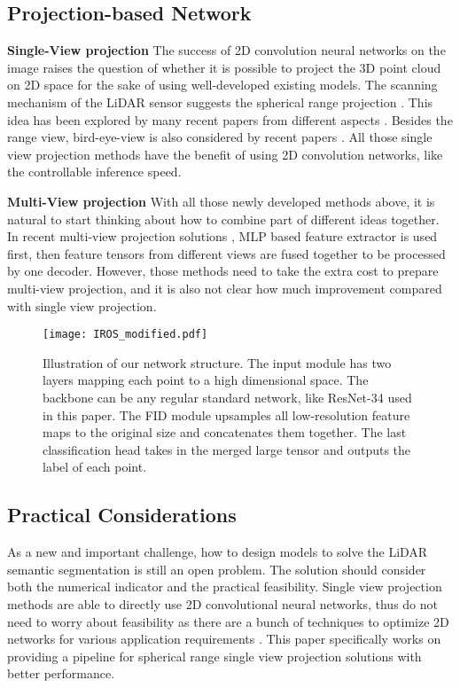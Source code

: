 \documentclass[letterpaper, 10 pt, conference]{ieeeconf}
\begin{document}
\subsection{Projection-based Network}
\textbf{Single-View projection}
The success of 2D convolution neural networks on the image raises the question of whether it is possible to project the 3D point cloud on 2D space for the sake of using well-developed existing models. The scanning mechanism of the LiDAR sensor suggests the spherical range projection \cite{milioto2019rangenet++}. This idea has been explored by many recent papers from different aspects \cite{cortinhal2020salsanext, xu2020squeezesegv3, alonso20203d}. Besides the range view, bird-eye-view is also considered by recent papers \cite{zhang2020deep}. All those single view projection methods have the benefit of using 2D convolution networks, like the controllable inference speed.

\textbf{Multi-View projection}
With all those newly developed methods above, it is natural to start thinking about how to combine part of different ideas together. In recent multi-view projection solutions \cite{liong2020amvnet,gerdzhev2020tornado}, MLP based feature extractor is used first, then feature tensors from different views are fused together to be processed by one decoder. However, those methods need to take the extra cost to prepare multi-view projection, and it is also not clear how much improvement compared with single view projection.   


\begin{figure*}
\texttt{[image: IROS\_modified.pdf]}
    \caption{Illustration of our network structure. The input module has two  layers mapping each point to a high dimensional space. The backbone can be any regular standard network, like ResNet-34 used in this paper. The FID module upsamples all low-resolution feature maps to the original size and concatenates them together. The last classification head takes in the merged large tensor and outputs the label of each point.   }
    \label{fig:second}
    \vspace{-5mm}
\end{figure*}

\subsection{Practical Considerations}

As a new and important challenge, how to design models to solve the LiDAR semantic segmentation is still an open problem. The solution should consider both the numerical indicator and the practical feasibility. Single view projection methods are able to directly use 2D convolutional neural networks, thus do not need to worry about feasibility as there are a bunch of techniques to optimize 2D networks for various application requirements \cite{xu2018deep,molchanov2019importance}. This paper specifically works on providing a pipeline for spherical range single view projection solutions with better performance. 
\end{document}
